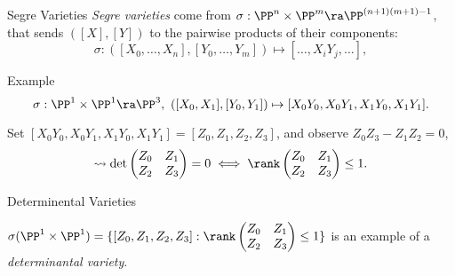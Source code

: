 \begin{frame}{Segre Varieties}
        \emph{Segre varieties} come from $\sigma: \PP^{n} \times \PP^{m} \ra \PP^{(n+1)(m+1) - 1}$, that sends $([X],[Y])$ to the pairwise products of their components:
            $$ \sigma : ([X_{0}, \ldots, X_{n}], [Y_{0}, \ldots, Y_{m}]) \mapsto [\ldots, X_{i}Y_{j}, \ldots ], $$

        \begin{block}{Example}
        $$\sigma : \PP^{1} \times \PP^{1} \ra \PP^{3},\ ([X_{0}, X_{1}], [Y_{0}, Y_{1}]) \mapsto [ X_{0}Y_{0}, X_{0}Y_{1}, X_{1}Y_{0}, X_{1}Y_{1} ].  $$
        
        Set $[ X_{0}Y_{0}, X_{0}Y_{1}, X_{1}Y_{0}, X_{1}Y_{1} ] = [Z_{0}, Z_{1}, Z_{2}, Z_{3}]$, and observe $Z_{0}Z_{3} - Z_{1}Z_{2} = 0$,
        $$ \rightsquigarrow \det \begin{pmatrix} Z_{0} & Z_{1} \\ Z_{2} & Z_{3} \end{pmatrix} = 0 \iff \rank \begin{pmatrix} Z_{0} & Z_{1} \\ Z_{2} & Z_{3} \end{pmatrix} \leq 1. $$
        \end{block}
\end{frame}

\begin{frame}{Determinental Varieties}
        
    $\sigma(\PP^{1} \times \PP^{1}) = \{ [Z_{0}, Z_{1}, Z_{2}, Z_{3}] : \rank \begin{pmatrix} Z_{0} & Z_{1} \\ Z_{2} & Z_{3} \end{pmatrix} \leq 1 \} $ is an example of a \emph{determinantal variety}.

     

\end{frame}
